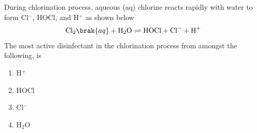 \item During chlorination process, aqueous (aq) chlorine reacts rapidly with water to form Cl$^{-}$, HOCl, and H$^{+}$ as shown below
\begin{align*}
    \text{Cl}_2 \brak{aq} + \text{H}_2 \text{O} \rightleftharpoons \text{HOCl} + \text{Cl}^{-} + \text{H}^{+}
\end{align*}
The most active disinfectant in the chlorination process from amongst the following, is
\begin{multicols}{2}
    \begin{enumerate}
        \item H$^{+}$
        \item HOCl
        \item Cl$^{-}$
        \item H$_2$O
    \end{enumerate}
\end{multicols}
